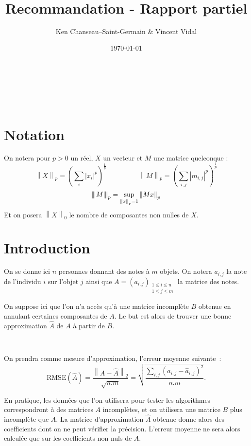 \documentclass[12pt, a4paper]{article}
\newcommand{\A}{A} %
\newcommand{\B}{B} %
\newcommand{\Ap}{\widehat{A}} %
\newcommand{\Ac}[2]{a_{#1,#2}} %
\newcommand{\Apc}[2]{\widehat{a}_{#1,#2}} %
\newcommand{\rmse}[1]{\mathrm{RMSE}\pp{#1}} %
\newcommand{\norme}[2]{\left\lVert #1 \right\rVert_{#2}} %
\newcommand{\tnorme}[2]{\left|\hspace{-1pt}\left\lVert #1
			\right\rVert\hspace{-1pt}\right|_{#2}} %
\newcommand{\pp}[1]{\left(#1\right)} %
\newcommand{\sdl}{

~

} %
\begin{document}
\title{Recommandation - Rapport partiel}
\author{Ken Chanseau--Saint-Germain \& Vincent Vidal}
\date{\today}
\maketitle

\tableofcontents
\sdl\sdl
\section*{Notation}
On notera pour $p>0$ un réel, $X$ un vecteur et $M$ une matrice quelconque : \[
	\norme{X}{p} = \pp{\sum_i \left|x_i\right|^p}^{\frac{1}{p}} \hspace{2cm} 
	\norme{M}{p} = \pp{\sum_{i, j} \left|m_{i,j}\right|^p}^{\frac{1}{p}}
\]\[
	\tnorme{M}{p} = \sup_{\norme{x}{p}=1} \norme{Mx}{p}
\]
Et on posera $\norme{X}{0}$ le nombre de composantes non nulles de $X$. 

\newpage
\hspace{1cm}
\section{Introduction}
On se donne ici $n$ personnes donnant des notes à $m$ objets.\newline
On notera $\Ac{i}{j}$ la note de l'individu $i$ sur l'objet $j$ ainsi que
$A = \pp{\Ac{i}{j}}_{\substack{1\leq i\leq n \\ 1 \leq j \leq m}}$
la matrice des notes.

On suppose ici que l'on n'a accès qu'à une matrice incomplète $\B$ obtenue
en annulant certaines composantes de $A$. Le but est alors de trouver
une bonne approximation $\Ap$ de $A$ à partir de $\B$.

\sdl

On prendra comme mesure d'approximation, l'erreur moyenne suivante~: \[
	\rmse{\Ap} = \frac{\norme{A-\Ap}{2}}{\sqrt{n.m}} = \sqrt{\frac{\sum_{i,j} \pp{\Ac{i}{j} - \Apc{i}{j}}^2}{n.m}}.
\]

En pratique, les données que l'on utilisera pour tester les algorithmes
correspondront à des matrices $\A$ incomplètes, et on utilisera
une matrice $\B$ plus incomplète que $\A$. La matrice d'approximation
$\Ap$ obtenue donne alors des coefficients dont on ne peut vérifier
la précision. L'erreur moyenne ne sera alors calculée que sur les
coefficients non nuls de $\A$.

\end{document}
